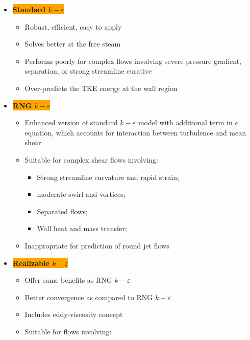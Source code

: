 \begin{itemize}
    \item \colorbox{orange}{\textbf{\color{white}Standard $k-\varepsilon$}}
    \begin{itemize}
        \item {\color{red}Robust, efficient, easy to apply}
        \item {\color{red}Solves better at the free steam}
        \item {\color{blue}Performs poorly for complex flows involving severe pressure gradient, separation, or strong streamline curative}
        \item {\color{blue}Over-predicts the TKE energy at the wall region}
    \end{itemize}
    \item \colorbox{orange}{\textbf{\color{white}RNG $k-\varepsilon$}}
    \begin{itemize}
        \item {\color{red}Enhanced version of standard $k-\varepsilon$ model with additional term in $\epsilon$ equation}, which accounts for interaction between turbulence and mean shear.
        \item {\color{red}Suitable for complex shear flows involving:}
        \begin{itemize}
            \item Strong streamline curvature and rapid strain;
            \item moderate swirl and vortices;
            \item Separated flows;
            \item Wall heat and mass transfer;
        \end{itemize}
        \item {\color{blue}Inappropriate for prediction of round jet flows}
    \end{itemize}
    \item \colorbox{orange}{\textbf{\color{white}Realizable $k-\varepsilon$}}
    \begin{itemize}
        \item {\color{red}Offer same benefits as RNG $k-\varepsilon$}
        \item {\color{red}Better convergence as compared to RNG $k-\varepsilon$}
        \item {\color{red}Includes eddy-viscosity concept}
        \item {\color{red}Suitable for flows involving:}
        \begin{itemize}

\end{itemize}
\end{itemize}
\end{itemize}
